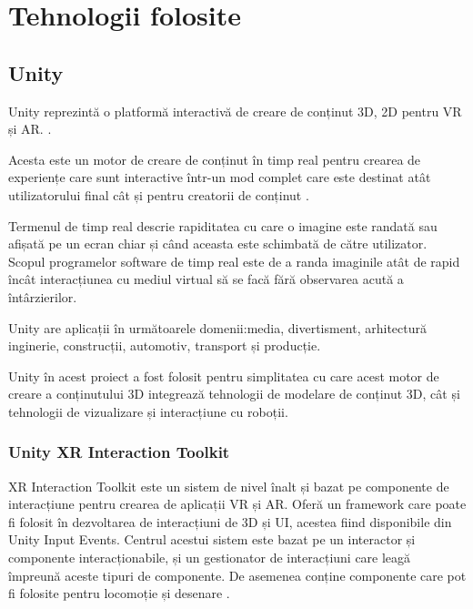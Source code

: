 \setcounter{page}{9}

\section{Tehnologii folosite}
\subsection{Unity}
Unity reprezintă o platformă interactivă de creare de conținut 3D,  2D pentru VR și AR. \cite{unity}.

Acesta este un motor de creare de conținut în timp real pentru crearea de experiențe care sunt interactive într-un mod complet care este destinat atât utilizatorului final cât și pentru creatorii de conținut \cite{unity}.

Termenul de timp real descrie rapiditatea cu care o imagine este randată sau afișată pe un ecran chiar și când aceasta este schimbată de către utilizator. Scopul programelor software de timp real este de a randa imaginile atât de rapid încât interacțiunea cu mediul virtual să se facă fără observarea acută a întârzierilor\cite{unity}.

Unity are aplicații în următoarele domenii:media, divertisment, arhitectură
inginerie, construcții, automotiv, transport și producție\cite{unity}.

Unity în acest proiect a fost folosit pentru simplitatea cu care acest motor de creare a conținutului 3D integrează tehnologii de modelare de conținut 3D, cât și tehnologii de vizualizare și interacțiune cu roboții\cite{unity}.

\subsubsection{Unity XR Interaction Toolkit}
XR Interaction Toolkit este un sistem de nivel înalt și bazat pe componente de interacțiune pentru crearea de aplicații VR și AR. Oferă un framework care poate fi folosit în dezvoltarea de interacțiuni de 3D și UI, acestea fiind disponibile din Unity Input Events. Centrul acestui sistem este bazat pe un interactor și componente interacționabile, și un gestionator de interacțiuni care leagă împreună aceste tipuri de componente. De asemenea conține componente care pot fi folosite pentru locomoție și desenare \cite{XRI}.

